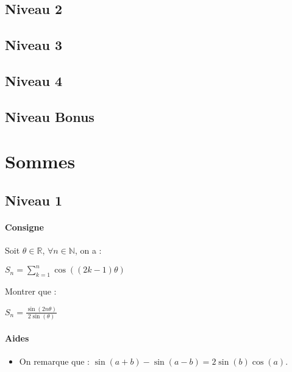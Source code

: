 \documentclass[a4paper]{report}
\begin{document}
			\subsection{Niveau 2}
		
			\subsection{Niveau 3}
			
			\subsection{Niveau 4}
			
			\subsection{Niveau Bonus}
		
		\section{Sommes}	
		
			\subsection{Niveau 1}
				\begin{tcolorbox}[colback=white,colframe=black,title=Exercice - Somme et fonctions trigonométriques]
				\paragraph{Consigne}
					Soit $\theta \in \mathbb{R}$, $\forall n \in \mathbb{N}$, on a :\\
					\begin{center}
						$S_n = \sum_{k=1}^{n} \cos ((2k-1)\theta)$
					\end{center}
					Montrer que :\\
					\begin{center}
						$S_n = \frac{\sin (2n \theta)}{2 \sin (\theta)}$
					\end{center}
					
				\tcblower					
					
				\paragraph{Aides}
					\begin{itemize}
						\item On remarque que : $\sin (a+b)- \sin (a-b)=2 \sin (b) \cos (a)$.
					\end{itemize}
				\end{tcolorbox}
				
\end{document}
